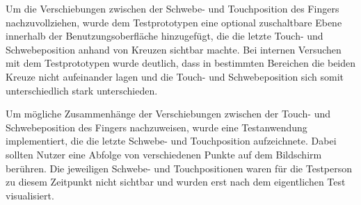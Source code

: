\documentclass[a4paper,BCOR2mm,12pt,bibliography=totoc,listof=totoc,abstracton]{scrreprt}
\begin{document}
Um die Verschiebungen zwischen der Schwebe- und Touchposition des Fingers nachzuvollziehen, wurde dem Testprototypen eine optional zuschaltbare Ebene innerhalb der Benutzungsoberfläche hinzugefügt, die die letzte Touch- und Schwebeposition anhand von Kreuzen sichtbar machte. Bei internen Versuchen mit dem Testprototypen wurde deutlich, dass in bestimmten Bereichen die beiden Kreuze nicht aufeinander lagen und die Touch- und Schwebeposition sich somit unterschiedlich stark unterschieden.

Um mögliche Zusammenhänge der Verschiebungen zwischen der Touch- und Schwebeposition des Fingers nachzuweisen, wurde eine Testanwendung implementiert, die die letzte Schwebe- und Touchposition aufzeichnete. Dabei sollten Nutzer eine Abfolge von verschiedenen Punkte auf dem Bildschirm berühren. Die jeweiligen Schwebe- und Touchpositionen waren für die Testperson zu diesem Zeitpunkt nicht sichtbar und wurden erst nach dem eigentlichen Test visualisiert.
\end{document}
